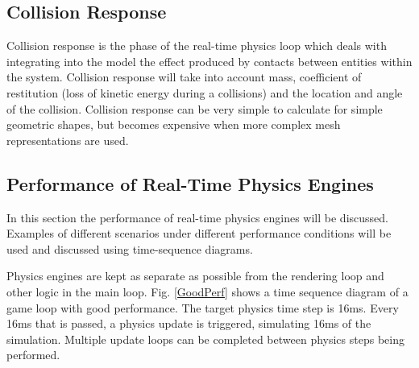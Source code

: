 

\subsection{Collision Response}

Collision response is the phase of the real-time physics loop which deals with integrating into the model the effect produced by contacts between entities within the system. Collision response will take into account mass, coefficient of restitution (loss of kinetic energy during a collisions) and the location and angle of the collision. Collision response can be very simple to calculate for simple geometric shapes, but becomes expensive when more complex mesh representations are used.

\subsection{Performance of Real-Time Physics Engines}
In this section the performance of real-time physics engines will be discussed. Examples of different scenarios under different performance conditions will be used and discussed using time-sequence diagrams.

Physics engines are kept as separate as possible from the rendering loop and other logic in the main loop. Fig. \ref{GoodPerf} shows a time sequence diagram of a game loop with good performance. The target physics time step is 16ms. Every 16ms that is passed, a physics update is triggered, simulating 16ms of the simulation. Multiple update loops can be completed between physics steps being performed.

